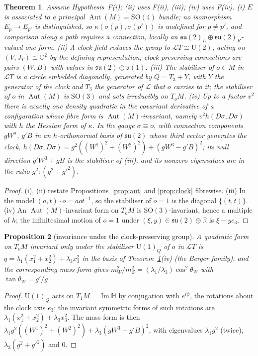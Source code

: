 \documentclass[aps,pra,onecolumn,superscriptaddress,nofootinbib,10pt]{revtex4-2}
\newtheorem{theorem}{Theorem}
\newtheorem{proposition}[theorem]{Proposition}
\theoremstyle{definition}
\theoremstyle{remark}
\newcommand{\R}{\mathbb{R}}
\newcommand{\C}{\mathbb{C}}
\newcommand{\HH}{\mathbb{H}}
\newcommand{\su}{\mathfrak{su}}
\newcommand{\cL}{\mathcal{L}}
\newcommand{\Aut}{\operatorname{Aut}}
\newcommand{\im}{\operatorname{Im}}
\newcommand{\SO}{\mathrm{SO}}
\newcommand{\U}{\mathrm{U}}
\begin{document}
\begin{theorem}\label{thm:gauge}
Assume Hypothesis~F(i); (ii) uses F(ii), (iii); (iv) uses F(iv).
(i) $E$ is associated to a principal $\Aut(M)=\SO(4)$ bundle; no isomorphism $E_p\to E_{p'}$ is
distinguished, so $\kappa(\sigma(p),\sigma(p'))$ is undefined for $p\ne p'$, and comparison along a
path requires a connection, locally an $\su(2)_L\oplus\su(2)_R$-valued one-form.
(ii) A clock field reduces the group to $\cL T\cong\U(2)$, acting on $(V,J_T)\cong\C^2$ by the defining
representation; clock-preserving connections are pairs $(W,B)$ with values in $\su(2)\oplus\mathfrak u(1)$.
(iii) The stabiliser of $o\in M$ in $\cL T$ is a circle embedded diagonally, generated by $Q=T_3+Y$,
with $Y$ the generator of the clock and $T_3$ the generator of $\cL$ that $o$ carries to it; the
stabiliser of $o$ in $\Aut(M)$ is $\SO(3)$ and acts irreducibly on $T_oM$.
(iv) Up to a factor $v^2$ there is exactly one density quadratic in the covariant derivative of a
configuration whose fibre form is $\Aut(M)$-invariant, namely $v^2h(D\sigma,D\sigma)$ with $h$ the
Hessian form of $\kappa$.  In the gauge $\sigma\equiv o$, with connection components $gW^a$, $g'B$ in an
$h$-orthonormal basis of $\su(2)$ whose third vector generates the clock,
$h(D\sigma,D\sigma)=g^2((W^1)^2+(W^2)^2)+(gW^3-g'B)^2$; its null direction $g'W^3+gB$ is the stabiliser
of (iii), and its nonzero eigenvalues are in the ratio $g^2:(g^2+g'^2)$.
\end{theorem}
\begin{proof}
(i), (ii) restate Propositions~\ref{prop:aut} and \ref{prop:clock} fibrewise.  (iii) In the model
$(a,t)\cdot o=aot^{-1}$, so the stabiliser of $o=1$ is the diagonal $\{(t,t)\}$.  (iv) An $\Aut(M)$-invariant form on
$T_oM$ is $\SO(3)$-invariant, hence a multiple of $h$; the infinitesimal motion of $o=1$ under
$(\xi,y)\in\su(2)\oplus\R$ is $\xi-ye_3$.
\end{proof}

\begin{proposition}[invariance under the clock-preserving group]\label{prop:berger}
A quadratic form on $T_oM$ invariant only under the stabiliser $\U(1)_Q$ of $o$ in $\cL T$ is
$q=\lambda_1(x_1^2+x_2^2)+\lambda_3x_3^2$ in the basis of Theorem~\ref{thm:gauge}(iv) (the Berger family), and
the corresponding mass form gives $m_W^2/m_Z^2=(\lambda_1/\lambda_3)\cos^2\theta_W$ with $\tan\theta_W=g'/g$.
\end{proposition}
\begin{proof}
$\U(1)_Q$ acts on $T_1M=\im\HH$ by conjugation with $e^{i\phi}$, the rotations about the clock axis
$e_3$; the invariant symmetric forms of such rotations are $\lambda_1(x_1^2+x_2^2)+\lambda_3x_3^2$.  The mass
form is then $\lambda_1g^2((W^1)^2+(W^2)^2)+\lambda_3(gW^3-g'B)^2$, with eigenvalues $\lambda_1g^2$ (twice),
$\lambda_3(g^2+g'^2)$ and $0$.
\end{proof}
\end{document}
